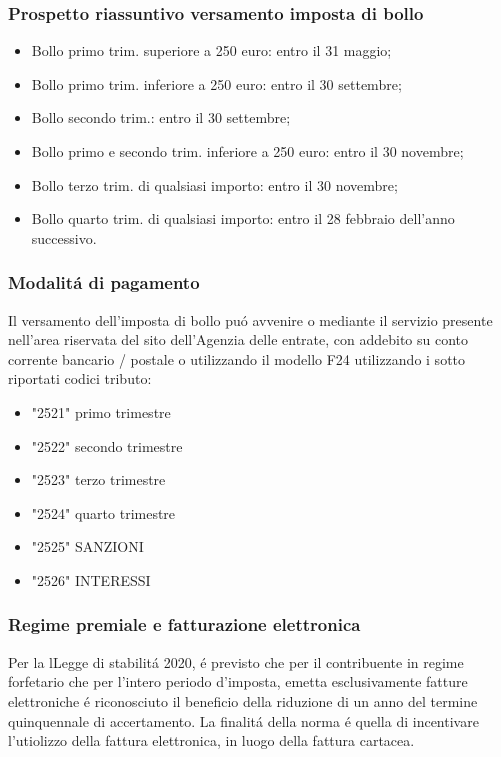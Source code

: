 \documentclass{article}
\begin{document}
\subsubsection{Prospetto riassuntivo versamento imposta di bollo}
\begin{itemize}
    \item Bollo primo trim. superiore a 250 euro: entro il 31 maggio;
    \item Bollo primo trim. inferiore a 250 euro: entro il 30 settembre;
    \item Bollo secondo trim.: entro il 30 settembre;
    \item Bollo primo e secondo trim. inferiore a 250 euro: entro il 30 novembre;
    \item Bollo terzo trim. di qualsiasi importo: entro il 30 novembre;
    \item Bollo quarto trim. di qualsiasi importo: entro il 28 febbraio dell'anno successivo.
\end{itemize}

\subsubsection{Modalit\'a di pagamento}
Il versamento dell'imposta di bollo pu\'o avvenire o mediante il servizio presente nell'area riservata del sito dell'Agenzia delle entrate, con addebito su conto corrente bancario / postale o utilizzando il modello F24 utilizzando i sotto riportati codici tributo:

\begin{itemize}
    \item "2521" primo trimestre
    \item "2522" secondo trimestre
    \item "2523" terzo trimestre
    \item "2524" quarto trimestre
    \item "2525" SANZIONI
    \item "2526" INTERESSI
\end{itemize}

\subsubsection{Regime premiale e fatturazione elettronica}
Per la lLegge di stabilit\'a 2020, \'e previsto che per il contribuente in regime forfetario che per l'intero periodo d'imposta, emetta esclusivamente fatture elettroniche \'e riconosciuto il beneficio della riduzione di un anno del termine quinquennale di accertamento. La finalit\'a della norma \'e quella di incentivare l'utiolizzo della fattura elettronica, in luogo della fattura cartacea.
\end{document}
